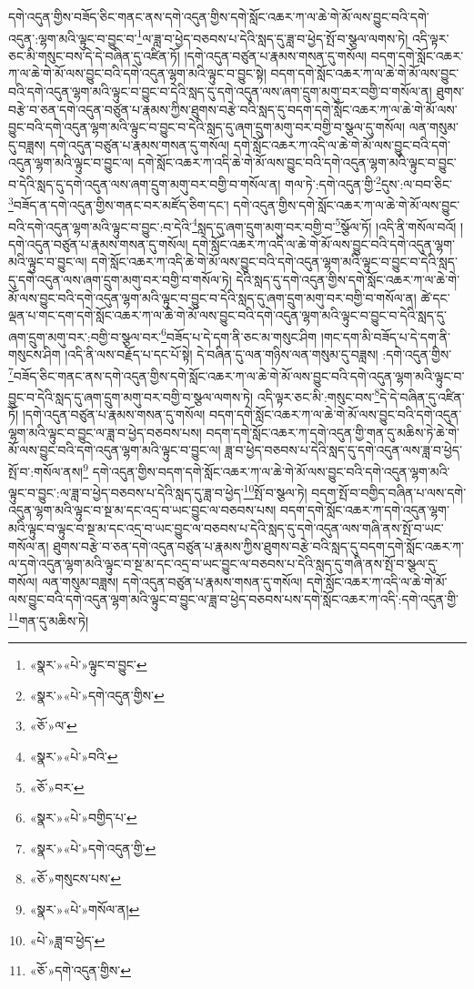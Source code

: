 དགེ་འདུན་གྱིས་བཟོད་ཅིང་གནང་ནས་དགེ་འདུན་གྱིས་དགེ་སློང་འཆར་ཀ་ལ་ཆེ་གེ་མོ་ལས་བྱུང་བའི་དགེ་འདུན་:ལྷག་མའི་ལྟུང་བ་བྱུང་བ་\footnote{«སྣར་»«པེ་»ལྟུང་བ་བྱུང་}ལ་ཟླ་བ་ཕྱེད་བཅབས་པ་དེའི་སླད་དུ་ཟླ་བ་ཕྱེད་སྤོ་བ་སྩལ་ལགས་ཏེ། འདི་ལྟར་ཅང་མི་གསུང་བས་དེ་དེ་བཞིན་དུ་འཛིན་ཏོ། །དགེ་འདུན་བཙུན་པ་རྣམས་གསན་དུ་གསོལ། བདག་དགེ་སློང་འཆར་ཀ་ལ་ཆེ་གེ་མོ་ལས་བྱུང་བའི་དགེ་འདུན་ལྷག་མའི་ལྟུང་བ་བྱུང་སྟེ། བདག་དགེ་སློང་འཆར་ཀ་ལ་ཆེ་གེ་མོ་ལས་བྱུང་བའི་དགེ་འདུན་ལྷག་མའི་ལྟུང་བ་བྱུང་བ་དེའི་སླད་དུ་དགེ་འདུན་ལས་ཞག་དྲུག་མགུ་བར་བགྱི་བ་གསོལ་ན། ཐུགས་བརྩེ་བ་ཅན་དགེ་འདུན་བཙུན་པ་རྣམས་ཀྱིས་ཐུགས་བརྩེ་བའི་སླད་དུ་བདག་དགེ་སློང་འཆར་ཀ་ལ་ཆེ་གེ་མོ་ལས་བྱུང་བའི་དགེ་འདུན་ལྷག་མའི་ལྟུང་བ་བྱུང་བ་དེའི་སླད་དུ་ཞག་དྲུག་མགུ་བར་བགྱི་བ་སྩལ་དུ་གསོལ། ལན་གསུམ་དུ་བཟླས། དགེ་འདུན་བཙུན་པ་རྣམས་གསན་དུ་གསོལ། དགེ་སློང་འཆར་ཀ་འདི་ལ་ཆེ་གེ་མོ་ལས་བྱུང་བའི་དགེ་འདུན་ལྷག་མའི་ལྟུང་བ་བྱུང་ལ། དགེ་སློང་འཆར་ཀ་འདི་ཆེ་གེ་མོ་ལས་བྱུང་བའི་དགེ་འདུན་ལྷག་མའི་ལྟུང་བ་བྱུང་བ་དེའི་སླད་དུ་དགེ་འདུན་ལས་ཞག་དྲུག་མགུ་བར་བགྱི་བ་གསོལ་ན། གལ་ཏེ་:དགེ་འདུན་གྱི་\footnote{«སྣར་»«པེ་»དགེ་འདུན་གྱིས་}དུས་:ལ་བབ་ཅིང་\footnote{«ཅོ་»ལ་}བཟོད་ན་དགེ་འདུན་གྱིས་གནང་བར་མཛོད་ཅིག་དང་། དགེ་འདུན་གྱིས་དགེ་སློང་འཆར་ཀ་ལ་ཆེ་གེ་མོ་ལས་བྱུང་བའི་དགེ་འདུན་ལྷག་མའི་ལྟུང་བ་བྱུང་:བ་དེའི་\footnote{«སྣར་»«པེ་»བའི་}སླད་དུ་ཞག་དྲུག་མགུ་བར་བགྱི་བ་\footnote{«ཅོ་»བར་}སྩོལ་ཏོ། །འདི་ནི་གསོལ་བའོ། །དགེ་འདུན་བཙུན་པ་རྣམས་གསན་དུ་གསོལ། དགེ་སློང་འཆར་ཀ་འདི་ལ་ཆེ་གེ་མོ་ལས་བྱུང་བའི་དགེ་འདུན་ལྷག་མའི་ལྟུང་བ་བྱུང་ལ། དགེ་སློང་འཆར་ཀ་འདི་ཆེ་གེ་མོ་ལས་བྱུང་བའི་དགེ་འདུན་ལྷག་མའི་ལྟུང་བ་བྱུང་བ་དེའི་སླད་དུ་དགེ་འདུན་ལས་ཞག་དྲུག་མགུ་བར་བགྱི་བ་གསོལ་ཏེ། དེའི་སླད་དུ་དགེ་འདུན་གྱིས་དགེ་སློང་འཆར་ཀ་ལ་ཆེ་གེ་མོ་ལས་བྱུང་བའི་དགེ་འདུན་ལྷག་མའི་ལྟུང་བ་བྱུང་བ་དེའི་སླད་དུ་ཞག་དྲུག་མགུ་བར་བགྱི་བ་གསོལ་ན། ཚེ་དང་ལྡན་པ་གང་དག་དགེ་སློང་འཆར་ཀ་ལ་ཆེ་གེ་མོ་ལས་བྱུང་བའི་དགེ་འདུན་ལྷག་མའི་ལྟུང་བ་བྱུང་བ་དེའི་སླད་དུ་ཞག་དྲུག་མགུ་བར་:བགྱི་བ་སྩལ་བར་\footnote{«སྣར་»«པེ་»བགྱིད་པ་}བཟོད་པ་དེ་དག་ནི་ཅང་མ་གསུང་ཤིག །གང་དག་མི་བཟོད་པ་དེ་དག་ནི་གསུངས་ཤིག །འདི་ནི་ལས་བརྗོད་པ་དང་པོ་སྟེ། དེ་བཞིན་དུ་ལན་གཉིས་ལན་གསུམ་དུ་བཟླས། :དགེ་འདུན་གྱིས་\footnote{«སྣར་»«པེ་»དགེ་འདུན་གྱི་}བཟོད་ཅིང་གནང་ནས་དགེ་འདུན་གྱིས་དགེ་སློང་འཆར་ཀ་ལ་ཆེ་གེ་མོ་ལས་བྱུང་བའི་དགེ་འདུན་ལྷག་མའི་ལྟུང་བ་བྱུང་བ་དེའི་སླད་དུ་ཞག་དྲུག་མགུ་བར་བགྱི་བ་སྩལ་ལགས་ཏེ། འདི་ལྟར་ཅང་མི་:གསུང་བས་\footnote{«ཅོ་»གསུངས་པས་}དེ་དེ་བཞིན་དུ་འཛིན་ཏོ། །དགེ་འདུན་བཙུན་པ་རྣམས་གསན་དུ་གསོལ། བདག་དགེ་སློང་འཆར་ཀ་ལ་ཆེ་གེ་མོ་ལས་བྱུང་བའི་དགེ་འདུན་ལྷག་མའི་ལྟུང་བ་བྱུང་ལ་ཟླ་བ་ཕྱེད་བཅབས་པས། བདག་དགེ་སློང་འཆར་ཀ་དགེ་འདུན་གྱི་གན་དུ་མཆིས་ཏེ་ཆེ་གེ་མོ་ལས་བྱུང་བའི་དགེ་འདུན་ལྷག་མའི་ལྟུང་བ་བྱུང་ལ། ཟླ་བ་ཕྱེད་བཅབས་པ་དེའི་སླད་དུ་དགེ་འདུན་ལས་ཟླ་བ་ཕྱེད་སྤོ་བ་:གསོལ་ནས།\footnote{«སྣར་»«པེ་»གསོལ་ན།} དགེ་འདུན་གྱིས་བདག་དགེ་སློང་འཆར་ཀ་ལ་ཆེ་གེ་མོ་ལས་བྱུང་བའི་དགེ་འདུན་ལྷག་མའི་ལྟུང་བ་བྱུང་:ལ་ཟླ་བ་ཕྱེད་བཅབས་པ་དེའི་སླད་དུ་ཟླ་བ་ཕྱེད་\footnote{«པེ་»ཟླ་བ་ཕྱེད་}སྤོ་བ་སྩལ་ཏེ། བདག་སྤོ་བ་བགྱིད་བཞིན་པ་ལས་དགེ་འདུན་ལྷག་མའི་ལྟུང་བ་སྔ་མ་དང་འདྲ་བ་ཡང་བྱུང་ལ་བཅབས་པས། བདག་དགེ་སློང་འཆར་ཀ་དགེ་འདུན་ལྷག་མའི་ལྟུང་བ་ལྟུང་བ་སྔ་མ་དང་འདྲ་བ་ཡང་བྱུང་ལ་བཅབས་པ་དེའི་སླད་དུ་དགེ་འདུན་ལས་གཞི་ནས་སྤོ་བ་ཡང་གསོལ་ན། ཐུགས་བརྩེ་བ་ཅན་དགེ་འདུན་བཙུན་པ་རྣམས་ཀྱིས་ཐུགས་བརྩེ་བའི་སླད་དུ་བདག་དགེ་སློང་འཆར་ཀ་ལ་དགེ་འདུན་ལྷག་མའི་ལྟུང་བ་སྔ་མ་དང་འདྲ་བ་ཡང་བྱུང་ལ་བཅབས་པ་དེའི་སླད་དུ་གཞི་ནས་སྤོ་བ་སྩལ་དུ་གསོལ། ལན་གསུམ་བཟླས། དགེ་འདུན་བཙུན་པ་རྣམས་གསན་དུ་གསོལ། དགེ་སློང་འཆར་ཀ་འདི་ལ་ཆེ་གེ་མོ་ལས་བྱུང་བའི་དགེ་འདུན་ལྷག་མའི་ལྟུང་བ་བྱུང་ལ་ཟླ་བ་ཕྱེད་བཅབས་པས་དགེ་སློང་འཆར་ཀ་འདི་:དགེ་འདུན་གྱི་\footnote{«ཅོ་»དགེ་འདུན་གྱིས་}གན་དུ་མཆིས་ཏེ། 